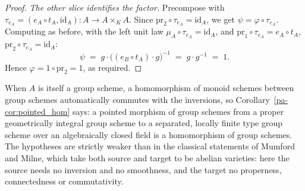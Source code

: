 \begin{proof}
  \emph{The other slice identifies the factor.} Precompose with
  \(\tau_{e_A} = (e_A \circ t_A, \mathrm{id}_A) : A \to A \times_K A\). Since
  \(\mathrm{pr}_2 \circ \tau_{e_A} = \mathrm{id}_A\), we get
  \(\psi = \varphi \circ \tau_{e_A}\). Computing as before, with the left unit law
  \(\mu_A \circ \tau_{e_A} = \mathrm{id}_A\), and
  \(\mathrm{pr}_1 \circ \tau_{e_A} = e_A \circ t_A\),
  \(\mathrm{pr}_2 \circ \tau_{e_A} = \mathrm{id}_A\):
  \[
    \psi \;=\; g \cdot \bigl((e_B \circ t_A) \cdot g\bigr)^{-1}
        \;=\; g \cdot g^{-1} \;=\; 1 .
  \]
  Hence \(\varphi = 1 \circ \mathrm{pr}_2 = 1\), as required.
\end{proof}

When \(A\) is itself a group scheme, a homomorphism of monoid schemes between group schemes
automatically commutes with the inversions, so Corollary~\ref{pa-cor:pointed_hom} says: a
pointed morphism of group schemes from a proper geometrically integral group scheme to a
separated, locally finite type group scheme over an algebraically closed field is a
homomorphism of group schemes. The hypotheses are strictly weaker than in the classical
statements of Mumford and Milne, which take both source and target to be abelian varieties:
here the source needs no inversion and no smoothness, and the target no properness,
connectedness or commutativity.
